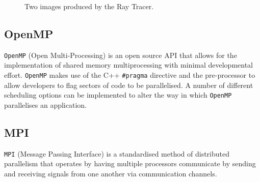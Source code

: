 \documentclass[journal,transmag]{IEEEtran}
\begin{document}
			\begin{figure}[]
				\centering
				\hfil
				\caption{Two images produced by the Ray Tracer.}
				\label{fig_sim}
			\end{figure}
		
		
	\subsection{OpenMP}
		\texttt{OpenMP} (Open Multi-Processing) is an open source API that allows for the implementation of shared memory multiprocessing with minimal developmental effort. \texttt{OpenMP} makes use of the C++ \texttt{\#pragma} directive and the pre-processor to allow developers to flag sectors of code to be parallelised. A number of different scheduling options can be implemented to alter the way in which \texttt{OpenMP} parallelises an application.



	
	\subsection{MPI}
		\texttt{MPI} (Message Passing Interface) is a standardised method of distributed parallelism that operates by having multiple processors communicate by sending and receiving signals from one another via communication channels. 
		
\end{document}
